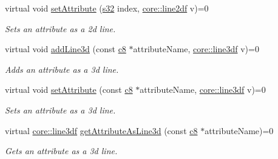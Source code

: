 \begin{DoxyCompactItemize}
\mbox{\label{classirr_1_1io_1_1IAttributes_a818870208df1c6dc37462451761efab1}} 
virtual void \hyperlink{classirr_1_1io_1_1IAttributes_a818870208df1c6dc37462451761efab1}{set\+Attribute} (\hyperlink{namespaceirr_ac66849b7a6ed16e30ebede579f9b47c6}{s32} index, \hyperlink{namespaceirr_1_1core_aeb733b0cceca2d174bf42ad477566204}{core\+::line2df} v)=0
\begin{DoxyCompactList}\small\item\em Sets an attribute as a 2d line. \end{DoxyCompactList}\item 
\mbox{\label{classirr_1_1io_1_1IAttributes_abbfb8cb612936e2f9c4b6728deb4b0c9}} 
virtual void \hyperlink{classirr_1_1io_1_1IAttributes_abbfb8cb612936e2f9c4b6728deb4b0c9}{add\+Line3d} (const \hyperlink{namespaceirr_a9395eaea339bcb546b319e9c96bf7410}{c8} $\ast$attribute\+Name, \hyperlink{namespaceirr_1_1core_acadb288f9aca3bf2d1222abcdf77114e}{core\+::line3df} v)=0
\begin{DoxyCompactList}\small\item\em Adds an attribute as a 3d line. \end{DoxyCompactList}\item 
\mbox{\label{classirr_1_1io_1_1IAttributes_a0f7d2a6c68c2faa0933189c3d6a55913}} 
virtual void \hyperlink{classirr_1_1io_1_1IAttributes_a0f7d2a6c68c2faa0933189c3d6a55913}{set\+Attribute} (const \hyperlink{namespaceirr_a9395eaea339bcb546b319e9c96bf7410}{c8} $\ast$attribute\+Name, \hyperlink{namespaceirr_1_1core_acadb288f9aca3bf2d1222abcdf77114e}{core\+::line3df} v)=0
\begin{DoxyCompactList}\small\item\em Sets an attribute as a 3d line. \end{DoxyCompactList}\item 
virtual \hyperlink{namespaceirr_1_1core_acadb288f9aca3bf2d1222abcdf77114e}{core\+::line3df} \hyperlink{classirr_1_1io_1_1IAttributes_ab6da415d43f2a4211026b191b17b0938}{get\+Attribute\+As\+Line3d} (const \hyperlink{namespaceirr_a9395eaea339bcb546b319e9c96bf7410}{c8} $\ast$attribute\+Name)=0
\begin{DoxyCompactList}\small\item\em Gets an attribute as a 3d line. \end{DoxyCompactList}\item 

\end{DoxyCompactItemize}
